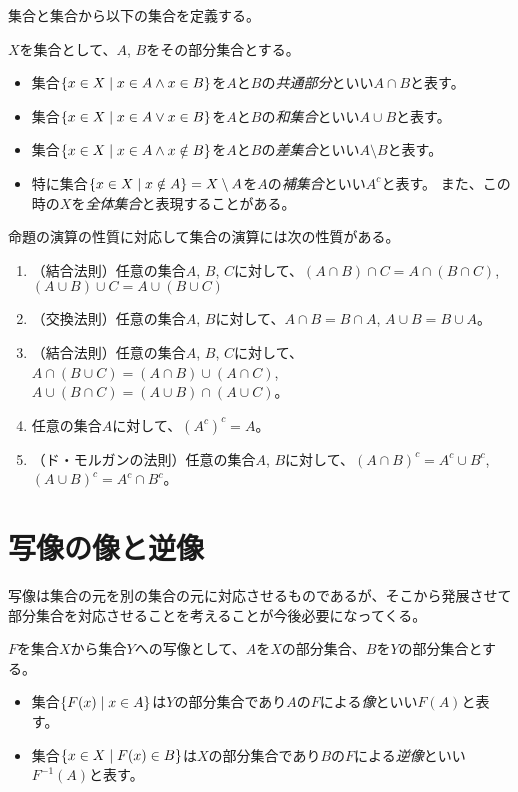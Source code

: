 集合と集合から以下の集合を定義する。

\begin{definition}[集合の演算]
$X$を集合として、$A$, $B$をその部分集合とする。
\begin{itemize}
\item
集合$\{ x \in X \mid x \in A \land x \in B \}$を$A$と$B$の\emph{共通部分}といい$A\cap B$と表す。
\item
集合$\{ x \in X \mid x \in A \lor x \in B \}$を$A$と$B$の\emph{和集合}といい$A\cup B$と表す。
\item
集合$\{ x \in X \mid x \in A \land x \notin B \}$を$A$と$B$の\emph{差集合}といい$A\setminus B$と表す。
\item
特に集合$\{ x \in X \mid x \notin A \} = X\setminus A$を$A$の\emph{補集合}といい$A^c$と表す。
また、この時の$X$を\emph{全体集合}と表現することがある。
\end{itemize}
\end{definition}

命題の演算の性質に対応して集合の演算には次の性質がある。
\begin{enumerate}
\item
（結合法則）任意の集合$A$, $B$, $C$に対して、$(A\cap B)\cap C = A\cap (B\cap C)$, $(A\cup B)\cup C = A\cup (B\cup C)$
\item
（交換法則）任意の集合$A$, $B$に対して、$A\cap B = B\cap A$, $A\cup B = B\cup A$。
\item
（結合法則）任意の集合$A$, $B$, $C$に対して、$A\cap(B\cup C) = (A\cap B)\cup(A\cap C)$, $A\cup(B\cap C) = (A\cup B)\cap(A\cup C)$。
\item
任意の集合$A$に対して、$(A^c)^c = A$。
\item
（ド・モルガンの法則）任意の集合$A$, $B$に対して、$(A\cap B)^c = A^c\cup B^c$, $(A\cup B)^c = A^c\cap B^c$。
\end{enumerate}

\section{写像の像と逆像}

写像は集合の元を別の集合の元に対応させるものであるが、そこから発展させて部分集合を対応させることを考えることが今後必要になってくる。

\begin{definition}[写像の像と逆像]
$F$を集合$X$から集合$Y$への写像として、$A$を$X$の部分集合、$B$を$Y$の部分集合とする。
\begin{itemize}
\item
集合$\{ F(x) \mid x \in A \}$は$Y$の部分集合であり$A$の$F$による\emph{像}といい$F(A)$と表す。
\item
集合$\{ x \in X \mid F(x) \in B \}$は$X$の部分集合であり$B$の$F$による\emph{逆像}といい$F^{-1}(A)$と表す。
\end{itemize}
\end{definition}

